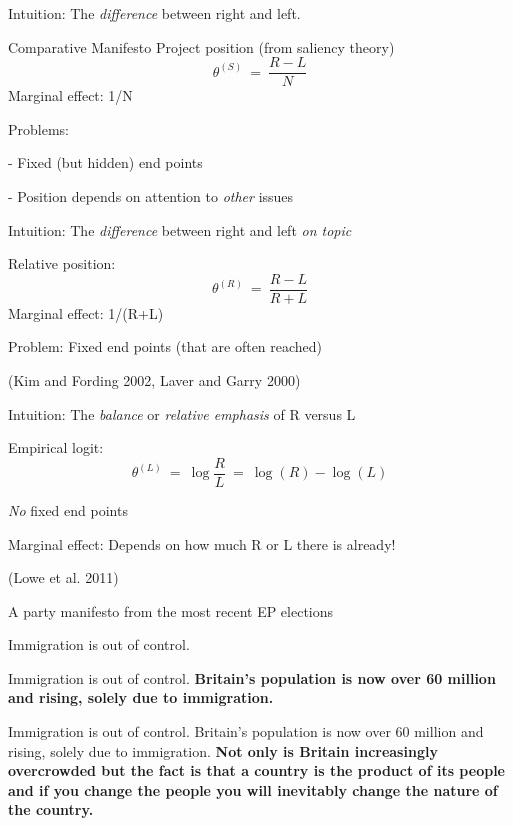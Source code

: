 \documentclass[kp]{foilpack}
\begin{document}

Intuition: The \textsl{difference} between right and left.

Comparative Manifesto Project position (from saliency theory)
\[
\theta^{(S)} ~=~ \frac{R-L}{N}
\]
Marginal effect: 1/N

Problems:
\ita
\item[-] Fixed (but hidden) end points
\item[-] Position depends on attention to \textit{other} issues  
\itz


Intuition: The \textit{difference} between right and left \textsl{on topic}

Relative position:
\[
\theta^{(R)} ~=~ \frac{R-L}{R+L}
\]
Marginal effect: 1/(R+L)

Problem:
\ita
\itm Fixed end points (that are often reached)
\itz

(Kim and Fording 2002, Laver and Garry 2000)


Intuition: The \textsl{balance} or \textit{relative emphasis} of R versus L

Empirical logit:
\[
\theta^{(L)} ~=~ \log\frac{R}{L} ~=~ \log(R) - \log(L)
\]

\textsl{No} fixed end points

Marginal effect: Depends on how much R or L there is already!

(Lowe et al. 2011)


A party manifesto from the most recent EP elections

\newpage

\footnotesize
Immigration is out of control.
\normalsize

\newpage

\footnotesize
Immigration is out of control.
\textbf{Britain's population is now over 60 million and rising, solely due to immigration.}
\normalsize

\newpage

\footnotesize
Immigration is out of control.
Britain's population is now over 60 million and rising, solely due to immigration.
\textbf{Not only is Britain increasingly overcrowded but the fact is that a country is the product of its people  and
if you change the people you will inevitably change the nature of the country.}
\normalsize
\end{document}
